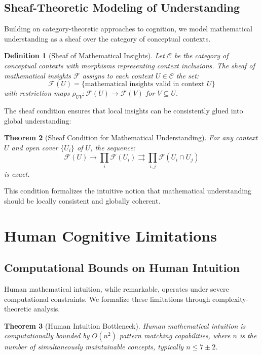 \documentclass[11pt]{article}
\newtheorem{theorem}{Theorem}[section]
\newtheorem{definition}[theorem]{Definition}
\newcommand{\F}{\mathcal{F}}
\begin{document}
\subsection{Sheaf-Theoretic Modeling of Understanding}

Building on category-theoretic approaches to cognition, we model mathematical understanding as a sheaf over the category of conceptual contexts.

\begin{definition}[Sheaf of Mathematical Insights]
Let $\mathcal{C}$ be the category of conceptual contexts with morphisms representing context inclusions. The sheaf of mathematical insights $\F$ assigns to each context $U \in \mathcal{C}$ the set:
$$\F(U) = \{\text{mathematical insights valid in context } U\}$$
with restriction maps $\rho_{UV}: \F(U) \to \F(V)$ for $V \subseteq U$.
\end{definition}

The sheaf condition ensures that local insights can be consistently glued into global understanding:

\begin{theorem}[Sheaf Condition for Mathematical Understanding]
For any context $U$ and open cover $\{U_i\}$ of $U$, the sequence:
$$\F(U) \to \prod_i \F(U_i) \rightrightarrows \prod_{i,j} \F(U_i \cap U_j)$$
is exact.
\end{theorem}

This condition formalizes the intuitive notion that mathematical understanding should be locally consistent and globally coherent.

\section{Human Cognitive Limitations}

\subsection{Computational Bounds on Human Intuition}

Human mathematical intuition, while remarkable, operates under severe computational constraints. We formalize these limitations through complexity-theoretic analysis.

\begin{theorem}[Human Intuition Bottleneck]
Human mathematical intuition is computationally bounded by $O(n^2)$ pattern matching capabilities, where $n$ is the number of simultaneously maintainable concepts, typically $n \leq 7 \pm 2$.
\end{theorem}
\end{document}
